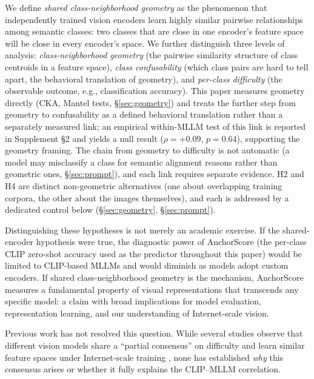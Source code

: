 \documentclass[a4paper,fleqn]{cas-sc}
\begin{document}
We define \emph{shared class-neighborhood geometry} as the phenomenon that independently trained vision encoders learn highly similar pairwise relationships among semantic classes: two classes that are close in one encoder's feature space will be close in every encoder's space. We further distinguish three levels of analysis: \emph{class-neighborhood geometry} (the pairwise similarity structure of class centroids in a feature space), \emph{class confusability} (which class pairs are hard to tell apart, the behavioral translation of geometry), and \emph{per-class difficulty} (the observable outcome, e.g., classification accuracy). This paper measures geometry directly (CKA, Mantel tests, \S\ref{sec:geometry}) and treats the further step from geometry to confusability as a defined behavioral translation rather than a separately measured link; an empirical within-MLLM test of this link is reported in Supplement \S2 and yields a null result ($\rho=+0.09$, $p=0.64$), supporting the geometry framing. The chain from geometry to difficulty is not automatic (a model may misclassify a class for semantic alignment reasons rather than geometric ones, \S\ref{sec:prompt}), and each link requires separate evidence. H2 and H4 are distinct non-geometric alternatives (one about overlapping training corpora, the other about the images themselves), and each is addressed by a dedicated control below (\S\ref{sec:geometry}, \S\ref{sec:prompt}).

Distinguishing these hypotheses is not merely an academic exercise. If the shared-encoder hypothesis were true, the diagnostic power of AnchorScore (the per-class CLIP zero-shot accuracy used as the predictor throughout this paper) would be limited to CLIP-based MLLMs and would diminish as models adopt custom encoders. If shared class-neighborhood geometry is the mechanism, AnchorScore measures a fundamental property of visual representations that transcends any specific model: a claim with broad implications for model evaluation, representation learning, and our understanding of Internet-scale vision.

Previous work has not resolved this question. While several studies observe that different vision models share a ``partial consensus'' on difficulty \cite{geirhos2021partial} and learn similar feature spaces under Internet-scale training \cite{kornblith2019similarity}, none has established \emph{why} this consensus arises or whether it fully explains the CLIP--MLLM correlation.
\end{document}
